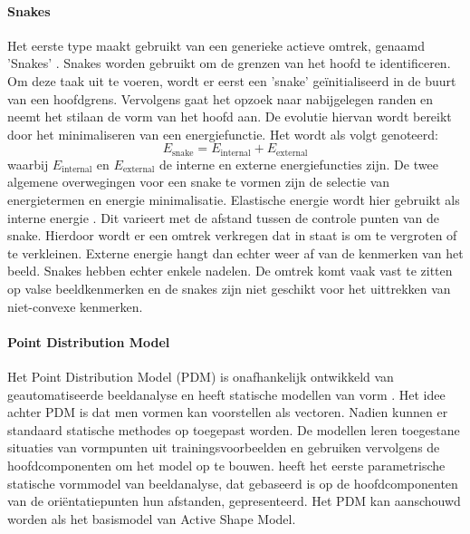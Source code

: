 \paragraph{Snakes}
Het eerste type maakt gebruikt van een generieke actieve omtrek, genaamd 'Snakes' \autocite{Kass1988}.
Snakes worden gebruikt om de grenzen van het hoofd te identificeren. Om deze taak uit te voeren, wordt er eerst een 'snake' geïnitialiseerd in de buurt van een hoofdgrens. Vervolgens gaat het opzoek naar nabijgelegen randen en neemt het stilaan de vorm van het hoofd aan. De evolutie hiervan wordt bereikt door het minimaliseren van een energiefunctie. Het wordt als volgt genoteerd:
\begin{equation*}
    E_{\text{snake}} = E_{\text{internal}} +  E_{\text{external}}
\end{equation*}
waarbij \(E_{\text{internal}} \) en \(E_{\text{external}} \) de interne en externe energiefuncties zijn.
De twee algemene overwegingen voor een snake te vormen zijn de selectie van energietermen en energie minimalisatie.
Elastische energie wordt hier gebruikt als interne energie \autocite{HJELMAS}. Dit varieert met de afstand tussen de controle punten van de snake. Hierdoor wordt er een omtrek verkregen dat in staat is om te vergroten of te verkleinen. Externe energie hangt dan echter weer af van de kenmerken van het beeld. Snakes hebben echter enkele nadelen. De omtrek komt vaak vast te zitten op valse beeldkenmerken en de snakes zijn niet geschikt voor het uittrekken van niet-convexe kenmerken.

\paragraph{Point Distribution Model}
Het Point Distribution Model (PDM) is onafhankelijk ontwikkeld van geautomatiseerde beeldanalyse en heeft statische modellen van vorm \autocite{HJELMAS}. Het idee achter PDM is dat men vormen kan voorstellen als vectoren. Nadien kunnen er standaard statische methodes op toegepast worden. De modellen leren toegestane situaties van vormpunten uit trainingsvoorbeelden en gebruiken vervolgens de hoofdcomponenten om het model op te bouwen. \textcite{Yuille1992} heeft het eerste parametrische statische vormmodel van beeldanalyse, dat gebaseerd is op de hoofdcomponenten van de oriëntatiepunten hun afstanden, gepresenteerd. Het PDM kan aanschouwd worden als het basismodel van Active Shape Model.


